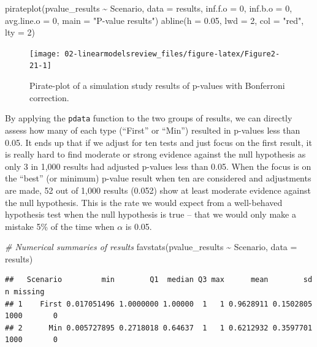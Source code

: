 \documentclass[
]{book}
\newenvironment{Shaded}{\begin{snugshade}}{\end{snugshade}}
\newcommand{\AttributeTok}[1]{\textcolor[rgb]{0.77,0.63,0.00}{#1}}
\newcommand{\CommentTok}[1]{\textcolor[rgb]{0.56,0.35,0.01}{\textit{#1}}}
\newcommand{\DecValTok}[1]{\textcolor[rgb]{0.00,0.00,0.81}{#1}}
\newcommand{\FloatTok}[1]{\textcolor[rgb]{0.00,0.00,0.81}{#1}}
\newcommand{\FunctionTok}[1]{\textcolor[rgb]{0.00,0.00,0.00}{#1}}
\newcommand{\NormalTok}[1]{#1}
\newcommand{\SpecialCharTok}[1]{\textcolor[rgb]{0.00,0.00,0.00}{#1}}
\newcommand{\StringTok}[1]{\textcolor[rgb]{0.31,0.60,0.02}{#1}}
\begin{document}
\begin{Shaded}
\begin{Highlighting}[]
\FunctionTok{pirateplot}\NormalTok{(pvalue\_results }\SpecialCharTok{\textasciitilde{}}\NormalTok{ Scenario, }\AttributeTok{data =}\NormalTok{ results, }\AttributeTok{inf.f.o =} \DecValTok{0}\NormalTok{, }\AttributeTok{inf.b.o =} \DecValTok{0}\NormalTok{,}
           \AttributeTok{avg.line.o =} \DecValTok{0}\NormalTok{, }\AttributeTok{main =} \StringTok{"P{-}value results"}\NormalTok{)}
\FunctionTok{abline}\NormalTok{(}\AttributeTok{h =} \FloatTok{0.05}\NormalTok{, }\AttributeTok{lwd =} \DecValTok{2}\NormalTok{, }\AttributeTok{col =} \StringTok{"red"}\NormalTok{, }\AttributeTok{lty =} \DecValTok{2}\NormalTok{)}
\end{Highlighting}
\end{Shaded}

\begin{figure}[ht!]

{\centering \texttt{[image: 02-linearmodelsreview\_files/figure-latex/Figure2-21-1]} 

}

\caption{Pirate-plot of a simulation study results of p-values with Bonferroni correction.}\label{fig:Figure2-21}
\end{figure}

\newpage

By applying the \texttt{pdata} function to the two groups of results, we can directly assess how many of each type (``First'' or ``Min'') resulted in p-values less than 0.05. It ends up that if we adjust for ten tests and just focus on the first result, it is really hard to find moderate or strong evidence against the null hypothesis as only 3 in 1,000 results had adjusted p-values less than 0.05. When the focus is on the ``best'' (or minimum) p-value result when ten are considered and adjustments are made, 52 out of 1,000 results (0.052) show at least moderate evidence against the null hypothesis. This is the rate we would expect from a well-behaved hypothesis test when the null hypothesis is true -- that we would only make a mistake 5\% of the time when \(\alpha\) is 0.05.

\begin{Shaded}
\begin{Highlighting}[]
\CommentTok{\# Numerical summaries of results}
\FunctionTok{favstats}\NormalTok{(pvalue\_results }\SpecialCharTok{\textasciitilde{}}\NormalTok{ Scenario, }\AttributeTok{data =}\NormalTok{ results)}
\end{Highlighting}
\end{Shaded}

\begin{verbatim}
##   Scenario         min        Q1  median Q3 max      mean        sd    n missing
## 1    First 0.017051496 1.0000000 1.00000  1   1 0.9628911 0.1502805 1000       0
## 2      Min 0.005727895 0.2718018 0.64637  1   1 0.6212932 0.3597701 1000       0
\end{verbatim}
\end{document}
